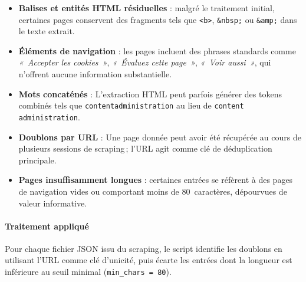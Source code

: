 \begin{tcolorbox}[
  enhanced, breakable,
  colback       = red!3!white,
  colframe      = red!38!black,
  colbacktitle  = red!38!black,
  coltitle      = white,
  fonttitle     = \small\bfseries\sffamily,
  title         = {Problèmes identifiés},
  arc           = 5pt,
  boxrule       = 0.75pt,
  toptitle      = 3.5pt, bottomtitle = 3.5pt,
  left = 8pt, right = 8pt, top = 6pt, bottom = 6pt,
]
\begin{itemize}[
  leftmargin = *,
  label      = {\textcolor{red!45!black}{\small$\blacktriangleright$}},
  itemsep    = 6pt,
  topsep     = 0pt,
  parsep     = 0pt
]

  \item {}\enspace
    \textbf{Balises et entités HTML résiduelles} : malgré le traitement initial,
    certaines pages conservent des fragments tels que \texttt{<b>}, \texttt{\&nbsp;}
    ou \texttt{\&amp;} dans le texte extrait.



  \item {}\enspace
    \textbf{Éléments de navigation} : les pages incluent des phrases standards comme \textit{«~Accepter les cookies~»}, \textit{«~Évaluez cette page~»}, \textit{«~Voir aussi~»}, qui n'offrent aucune information substantielle.
  \item {}\enspace
    \textbf{Mots concaténés} : L'extraction HTML peut parfois générer des tokens combinés tels que \texttt{contentadministration} au lieu de \texttt{content administration}.
  \item {}\enspace
    \textbf{Doublons par URL} : Une page donnée peut avoir été récupérée au cours de plusieurs sessions de scraping\,; l'URL agit comme clé de déduplication principale.
  \item {}\enspace
    \textbf{Pages insuffisamment longues} : certaines entrées se réfèrent à des pages de navigation vides ou comportant moins de 80~caractères, dépourvues de valeur informative.
\end{itemize}
\end{tcolorbox}

\paragraph{Traitement appliqué}
Pour chaque fichier JSON issu du scraping, le script identifie les doublons en utilisant l'URL comme clé d'unicité, puis écarte les entrées dont la longueur est inférieure au seuil minimal (\texttt{min\_chars = 80}).

